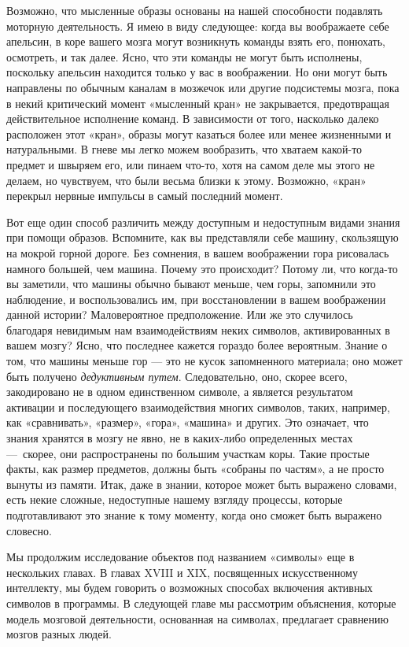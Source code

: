 \documentclass[../main.tex]{subfiles}
\begin{document}
Возможно, что мысленные образы основаны на нашей способности подавлять моторную деятельность. Я имею в виду следующее: когда вы воображаете себе апельсин, в коре вашего мозга могут возникнуть команды взять его, понюхать, осмотреть, и так далее. Ясно, что эти команды не могут быть исполнены, поскольку апельсин находится только у вас в воображении. Но они могут быть направлены по обычным каналам в мозжечок или другие подсистемы мозга, пока в некий критический момент «мысленный кран» не закрывается, предотвращая действительное исполнение команд. В зависимости от того, насколько далеко расположен этот «кран», образы могут казаться более или менее жизненными и натуральными. В гневе мы легко можем вообразить, что хватаем какой-то предмет и швыряем его, или пинаем что-то, хотя на самом деле мы этого не делаем, но чувствуем, что были весьма близки к этому. Возможно, «кран» перекрыл нервные импульсы в самый последний момент.

Вот еще один способ различить между доступным и недоступным видами знания при помощи образов. Вспомните, как вы представляли себе машину, скользящую на мокрой горной дороге. Без сомнения, в вашем воображении гора рисовалась намного большей, чем машина. Почему это происходит? Потому ли, что когда-то вы заметили, что машины обычно бывают меньше, чем горы, запомнили это наблюдение, и воспользовались им, при восстановлении в вашем воображении данной истории? Маловероятное предположение. Или же это случилось благодаря невидимым нам взаимодействиям неких символов, активированных в вашем мозгу? Ясно, что последнее кажется гораздо более вероятным. Знание о том, что машины меньше гор --- это не кусок запомненного материала; оно может быть получено \emph{дедуктивным путем}. Следовательно, оно, скорее всего, закодировано не в одном единственном символе, а является результатом активации и последующего взаимодействия многих символов, таких, например, как «сравнивать», «размер», «гора», «машина» и других. Это означает, что знания хранятся в мозгу не явно, не в каких-либо определенных местах ---~скорее, они распространены по большим участкам коры. Такие простые факты, как размер предметов, должны быть «собраны по частям», а не просто вынуты из памяти. Итак, даже в знании, которое может быть выражено словами, есть некие сложные, недоступные нашему взгляду процессы, которые подготавливают это знание к тому моменту, когда оно сможет быть выражено словесно.

Мы продолжим исследование объектов под названием «символы» еще в нескольких главах. В главах XVIII и XIX, посвященных искусственному интеллекту, мы будем говорить о возможных способах включения активных символов в программы. В следующей главе мы рассмотрим объяснения, которые модель мозговой деятельности, основанная на символах, предлагает сравнению мозгов разных людей.
\end{document}
